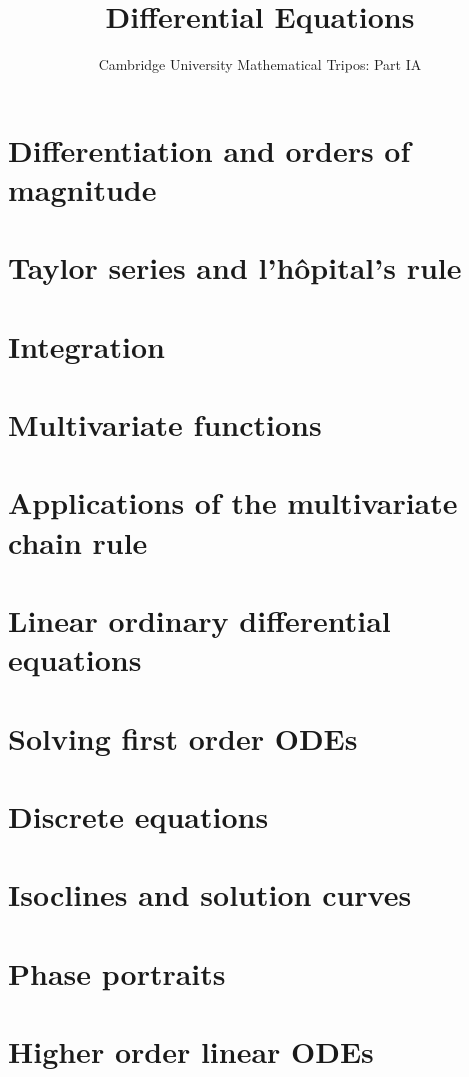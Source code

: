 \documentclass{article}
\title{Differential Equations}
\author{Cambridge University Mathematical Tripos: Part IA}
\begin{document}
\maketitle

\tableofcontentsnewpage{}

\section{Differentiation and orders of magnitude}

\section{Taylor series and l'h\^opital's rule}

\section{Integration}

\section{Multivariate functions}

\section{Applications of the multivariate chain rule}

\section{Linear ordinary differential equations}

\section{Solving first order ODEs}

\section{Discrete equations}

\section{Isoclines and solution curves}

\section{Phase portraits}

\section{Higher order linear ODEs}

\end{document}
